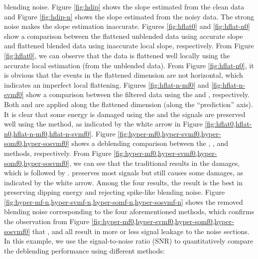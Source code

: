 blending noise. Figure \ref{fig:hdip} shows the slope estimated from the clean data and Figure \ref{fig:hdip-n} shows the slope estimated from the noisy data. The strong noise makes the slope estimation inaccurate. Figures \ref{fig:hflat0} and \ref{fig:hflat-n0} show a comparison between the flattened unblended data using accurate slope and flattened blended data using inaccurate local slope, respectively. From Figure \ref{fig:hflat0}, we can observe that the data is flattened well locally using the accurate local estimation (from the unblended data). From Figure \ref{fig:hflat-n0}, it is obvious that the events in the flattened dimension are not horizontal, which indicates an imperfect local flattening.  Figures \ref{fig:hflat-n-mf0} and \ref{fig:hflat-n-svmf0} show a comparison between the filtered data using the and , respectively. Both and  are applied along the flattened dimension (along the ``prediction'' axis). It is clear that some energy is damaged using the and the signals are preserved well using the  method, as indicated by the white arrow in Figure \ref{fig:hflat0,hflat-n0,hflat-n-mf0,hflat-n-svmf0}.  Figure \ref{fig:hyper-mf0,hyper-svmf0,hyper-somf0,hyper-sosvmf0} shows a deblending comparison between the  , , and  methods, respectively. From Figure \ref{fig:hyper-mf0,hyper-svmf0,hyper-somf0,hyper-sosvmf0}, we can see that the traditional results in the  damages, which is followed by .  preserves most signals but still causes some damages, as indicated by the white arrow. Among the four results, the  result is the best in preserving dipping energy and rejecting spike-like blending noise.  Figure \ref{fig:hyper-mf-n,hyper-svmf-n,hyper-somf-n,hyper-sosvmf-n} shows the removed blending noise corresponding to the four aforementioned methods, which confirms the observation from Figure \ref{fig:hyper-mf0,hyper-svmf0,hyper-somf0,hyper-sosvmf0} that  , and  all result in more or less signal leakage \cite[]{yangkang2015ortho} to the noise sections. In this example, we use the signal-to-noise ratio (SNR) to quantitatively compare the deblending performance using different methods:
